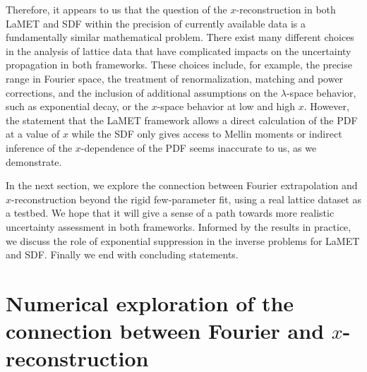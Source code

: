 \documentclass[aps,prl,groupedaddress,twocolumn,superscriptaddress,amsfonts,amssymb,amsmath,showpacs,floatfix,preprintnumbers]{revtex4-2}
\begin{document}
Therefore, it appears to us that the question of the $x$-reconstruction in both LaMET and SDF within the precision of currently available data is a fundamentally similar mathematical problem. There exist many different choices in the analysis of lattice data that have complicated impacts on the uncertainty propagation in both frameworks. These choices include, for example, the precise range in Fourier space, the treatment of renormalization, matching and power corrections, and the inclusion of additional assumptions on the $\lambda$-space behavior, such as exponential decay, or the $x$-space behavior at low and high $x$. However, the statement that the LaMET framework allows a direct calculation of the PDF at a value of $x$ while the SDF only gives access to Mellin moments or indirect inference of the $x$-dependence of the PDF \cite{Ji:2022ezo} seems inaccurate to us, as we demonstrate.

In the next section, we explore the connection between Fourier extrapolation and $x$-reconstruction beyond the rigid few-parameter fit, using a real lattice dataset as a testbed. We hope that it will give a sense of a path towards more realistic uncertainty assessment in both frameworks. Informed by the results in practice, we discuss the role of exponential suppression in the inverse problems for LaMET and SDF. Finally we end with concluding statements.

\section{Numerical exploration of the connection between Fourier and $x$-reconstruction}
\end{document}
